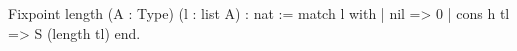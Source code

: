 Fixpoint length (A : Type) (l : list A) : nat :=
  match l with
  | nil => 0
  | cons h tl => S (length tl)
  end.